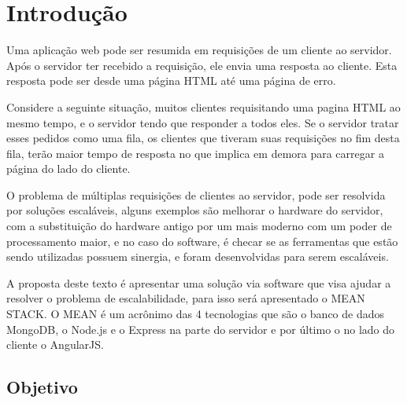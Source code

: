 \chapter{Introdu\c{c}\~ao}
\label{Introducao}

Uma aplicação web pode ser resumida em requisições de um cliente ao servidor. Após o servidor ter recebido a requisição, ele envia uma resposta ao cliente. Esta resposta pode ser desde uma página HTML até uma página de erro.

Considere a seguinte situação, muitos clientes requisitando uma pagina HTML ao mesmo tempo, e o servidor tendo que responder a todos eles. Se o servidor tratar esses pedidos como uma fila, os clientes que tiveram suas requisições no fim desta fila, terão maior tempo de resposta no que implica em demora para carregar a página do lado do cliente.

O problema de múltiplas requisições de clientes ao servidor, pode ser resolvida por soluções escaláveis, alguns exemplos são melhorar o hardware do servidor, com a substituição do hardware antigo por um mais moderno com um poder de processamento maior, e no caso do software, é checar se as ferramentas que estão sendo utilizadas possuem sinergia, e foram desenvolvidas para serem escaláveis.

A proposta deste texto é apresentar uma solução via software que visa ajudar a resolver o problema de escalabilidade, para isso será apresentado o MEAN STACK. O MEAN é um acrônimo das 4 tecnologias que são o banco de dados MongoDB, o Node.js e o Express na parte do servidor e por último o no lado do cliente o AngularJS.

\section{Objetivo}

